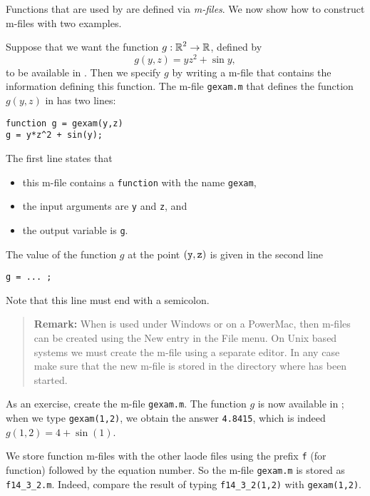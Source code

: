 \documentclass{ximera}
\begin{document}
Functions that are used by \Matlab are defined via 
{\em m-files}.  We now show how to construct m-files with two examples.

Suppose that we want the function $g:\mbox{$\Bbb{R}$}^2\to\mbox{$\Bbb{R}$}$, defined by
\begin{equation*}  \label{eq:gexam}
g(y,z) = yz^2 + \sin y,
\end{equation*}
to be available in \Matlabp.
Then we specify $g$ by writing a \Matlab m-file that contains the information 
defining this function.  The m-file {\tt gexam.m} that defines the function 
$g(y,z)$ in  has two lines:
\begin{verbatim}
function g = gexam(y,z)
g = y*z^2 + sin(y);
\end{verbatim}
The first line states that 
\begin{itemize}
\item this m-file contains a {\tt function} with the name {\tt gexam},
\item the input arguments are {\tt y} and {\tt z}, and
\item the output variable is {\tt g}.
\end{itemize}
The value of the function $g$ at the point ${\tt (y,z)}$ is given in the 
second line 
\begin{verbatim}
g = ... ;   
\end{verbatim}
Note that this line must end with a semicolon. 
\begin{quote}
{\bf Remark:} When \Matlab is used under Windows or on a PowerMac, then 
m-files
can be created using the {\sf New} entry in the {\sf File} menu.
On Unix based systems we must create the m-file using a separate
editor.  In any case make sure that the new m-file is stored in the directory
where \Matlab has been started.
\end{quote}
As an exercise, create the m-file {\tt gexam.m}.  The function $g$ is 
now available in \Matlabp; when we type {\tt gexam(1,2)}, 
we obtain the answer \verb+4.8415+, which is indeed $g(1,2)=4+\sin(1)$.

We store function m-files with the other {\sf laode} files using the prefix
{\tt f} (for function) followed by the equation number.  So the m-file 
{\tt gexam.m} is stored as {\tt f14\_3\_2.m}.  Indeed, compare the result of 
typing {\tt f14\_3\_2(1,2)} with {\tt gexam(1,2)}.
\end{document}
